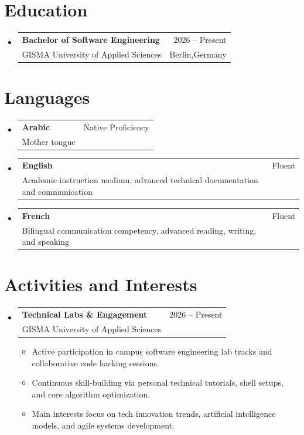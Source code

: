 \documentclass[A4,11pt]{article}
\makeatletter
\newcommand{\CVItem}[1]{
  \item\small{
    {#1 \vspace{3pt}} 
  }
}
\newcommand{\CVSubheading}[4]{
  \vspace{3pt}\item 
    \begin{tabular*}{0.97\textwidth}[t]{l@{\extracolsep{\fill}}r}
      \textbf{#1} & #2 \\
      \small#3 & \small #4 \\
    \end{tabular*}\vspace{-3pt} 
}
\newcommand{\CVSubHeadingListStart}{\begin{itemize}[leftmargin=0.5cm, label={}]}
\newcommand{\CVSubHeadingListEnd}{\end{itemize}}
\newcommand{\CVItemListStart}{\begin{itemize}[itemsep=4pt, topsep=2pt]}
\newcommand{\CVItemListEnd}{\end{itemize}\vspace{2pt}}
\makeatother
\begin{document}
\vspace{2pt}

\section{Education}
  \CVSubHeadingListStart
    \CVSubheading
      {Bachelor of Software Engineering}{2026 -- Present}
      {GISMA University of Applied Sciences}
      {Berlin,Germany}
      
      \CVItemListStart
      \CVItemListEnd
  \CVSubHeadingListEnd


\section{Languages}
  \CVSubHeadingListStart
    \CVSubheading
      {Arabic}{Native Proficiency}
      {Mother tongue}{}  
    \CVSubheading
      {English}{Fluent}
      {Academic instruction medium, advanced technical documentation and communication}{}  
    \CVSubheading
      {French}{Fluent}
      {Bilingual communication competency, advanced reading, writing, and speaking}{}
  \CVSubHeadingListEnd

\section{Activities and Interests}
  \CVSubHeadingListStart
    \CVSubheading
      {Technical Labs \& Engagement}{2026 -- Present}
      {GISMA University of Applied Sciences}{}
      \CVItemListStart
        \CVItem{Active participation in campus software engineering lab tracks and collaborative code hacking sessions.}
        \CVItem{Continuous skill-building via personal technical tutorials, shell setups, and core algorithm optimization.}
        \CVItem{Main interests focus on tech innovation trends, artificial intelligence models, and agile systems development.}
      \CVItemListEnd
  \CVSubHeadingListEnd

\end{document}
